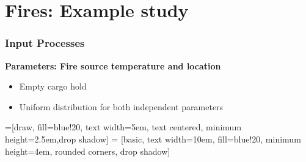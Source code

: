 \documentclass[9pt]{beamer}
\begin{document}
\section{Fires: Example study}
\label{sec-5}
\begin{frame}
\frametitle{Input Processes}
\label{sec-5-1}

\textbf{Parameters: Fire source temperature and location}
\begin{itemize}
\item Empty cargo hold
\item Uniform distribution for both independent parameters
\end{itemize}
\fontsize{9}\selectfont


=[draw, fill=blue!20, text width=5em, 
    text centered, minimum height=2.5em,drop shadow]
 = [basic, text width=10em, fill=blue!20, 
    minimum height=4em, rounded corners, drop shadow]


\end{frame}
\end{document}
